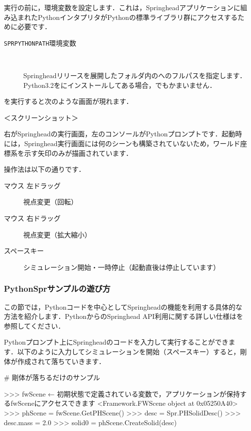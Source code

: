 \KLUDGE 実行の前に，環境変数を設定します．これは，Springheadアプリケーションに組み込まれたPythonインタプリタがPythonの標準ライブラリ群にアクセスするために必要です．
\begin{description}
\item[\texttt{SPRPYTHONPATH}環境変数]~

Springheadリリースを展開したフォルダ内のへのフルパスを指定します．Python3.2をにインストールしてある場合，でもかまいません．
\end{description}

を実行すると次のような画面が現れます．

\KLUDGE ＜スクリーンショット＞

\KLUDGE 右がSpringheadの実行画面，左のコンソールがPythonプロンプトです．起動時には，Springhead実行画面には何のシーンも構築されていないため，ワールド座標系を示す矢印のみが描画されています．

\KLUDGE 操作法は以下の通りです．
\begin{description}
\item[マウス 左ドラッグ] 視点変更（回転）
\item[マウス 右ドラッグ] 視点変更（拡大縮小）
\item[スペースキー] シミュレーション開始・一時停止（起動直後は停止しています）
\end{description}

\subsubsection*{PythonSprサンプルの遊び方}

\KLUDGE この節では，Pythonコードを中心としてSpringheadの機能を利用する具体的な方法を紹介します．PythonからのSpringhead API利用に関する詳しい仕様はを参照してください．

Pythonプロンプト上にSpringheadのコードを入力して実行することができます．以下のように入力してシミュレーションを開始（スペースキー）すると，剛体が作成されて落ちていきます．
\begin{sourcecode}
# 剛体が落ちるだけのサンプル

\KLUDGE >>> fwScene   ← 初期状態で定義されている変数で，アプリケーションが保持するfwSceneにアクセスできます
\KLUDGE <Framework.FWScene object at 0x05250A40>
\KLUDGE >>> phScene = fwScene.GetPHScene()
\KLUDGE >>> desc = Spr.PHSolidDesc()
\KLUDGE >>> desc.mass = 2.0
\KLUDGE >>> solid0 = phScene.CreateSolid(desc)
\end{sourcecode}

